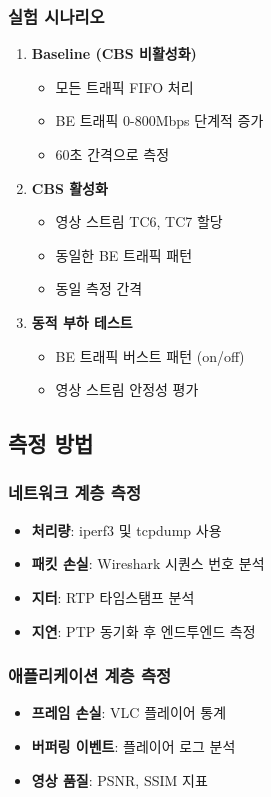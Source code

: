 \documentclass[10pt,twocolumn]{IEEEtran}
\begin{document}
\subsubsection{실험 시나리오}
\begin{enumerate}
\item \textbf{Baseline (CBS 비활성화)}
   \begin{itemize}
   \item 모든 트래픽 FIFO 처리
   \item BE 트래픽 0-800Mbps 단계적 증가
   \item 60초 간격으로 측정
   \end{itemize}
   
\item \textbf{CBS 활성화}
   \begin{itemize}
   \item 영상 스트림 TC6, TC7 할당
   \item 동일한 BE 트래픽 패턴
   \item 동일 측정 간격
   \end{itemize}
   
\item \textbf{동적 부하 테스트}
   \begin{itemize}
   \item BE 트래픽 버스트 패턴 (on/off)
   \item 영상 스트림 안정성 평가
   \end{itemize}
\end{enumerate}

\subsection{측정 방법}

\subsubsection{네트워크 계층 측정}
\begin{itemize}
\item \textbf{처리량}: iperf3 및 tcpdump 사용
\item \textbf{패킷 손실}: Wireshark 시퀀스 번호 분석
\item \textbf{지터}: RTP 타임스탬프 분석
\item \textbf{지연}: PTP 동기화 후 엔드투엔드 측정
\end{itemize}

\subsubsection{애플리케이션 계층 측정}
\begin{itemize}
\item \textbf{프레임 손실}: VLC 플레이어 통계
\item \textbf{버퍼링 이벤트}: 플레이어 로그 분석
\item \textbf{영상 품질}: PSNR, SSIM 지표
\end{itemize}
\end{document}
